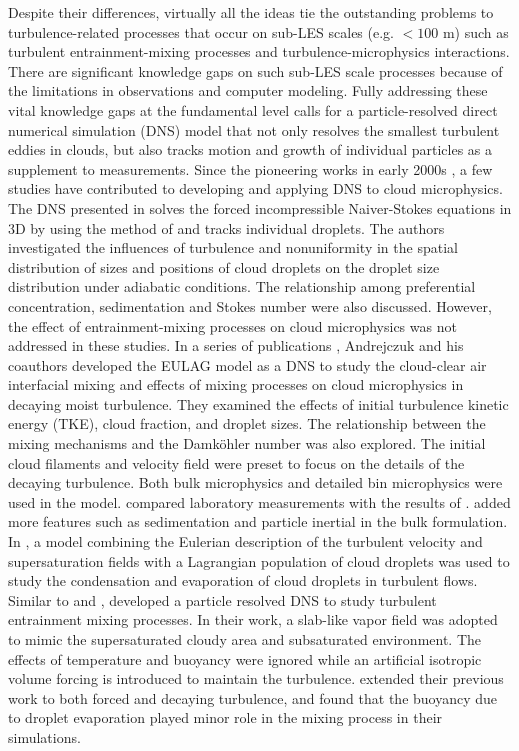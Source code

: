 \documentclass[draft,linenumbers]{AGUJournal}
\begin{document}
Despite their differences, virtually all the ideas tie the outstanding problems to turbulence-related processes that occur on sub-LES scales (e.g. $< 100$ m) such as turbulent entrainment-mixing processes and turbulence-microphysics interactions. There are significant knowledge gaps on such sub-LES scale processes because of the limitations in observations and computer modeling. Fully addressing these vital knowledge gaps at the fundamental level calls for a particle-resolved direct numerical simulation (DNS) model that not only resolves the smallest turbulent eddies in clouds, but also tracks motion and growth of individual particles as a supplement to measurements. Since the pioneering works in early 2000s \citep{Vaillancourt00, Vaillancourt02}, a few studies have contributed to developing and applying DNS to cloud microphysics. The DNS presented in \citet{Vaillancourt00, Vaillancourt02} solves the forced incompressible Naiver-Stokes equations in 3D by using the method of \citet{Sullivan1994} and tracks individual droplets. The authors investigated the influences of turbulence and nonuniformity in the spatial distribution of sizes and positions of cloud droplets on the droplet size distribution under adiabatic conditions. The relationship among preferential concentration, sedimentation and Stokes number were also discussed. However, the effect of entrainment-mixing processes on cloud microphysics was not addressed in these studies. In a series of publications \citep{And04, And06, And09}, Andrejczuk and his coauthors developed the EULAG model as a DNS to study the cloud-clear air interfacial mixing and effects of mixing processes on cloud microphysics in decaying moist turbulence. They examined the effects of initial turbulence kinetic energy (TKE), cloud fraction, and droplet sizes. The relationship between the mixing mechanisms and the Damk\"{o}hler number was also explored. The initial cloud filaments and velocity field were preset to focus on the details of the decaying turbulence. Both bulk microphysics and detailed bin microphysics were used in the model. \citet{Malinowski2008} compared laboratory measurements with the results of \citet{And04, And06}. \citet{LozarMellado2013} added more features such as sedimentation and particle inertial in the bulk formulation. In \citet{Lanotte2009, Celani05}, a model combining the Eulerian description of the turbulent velocity and supersaturation fields with a Lagrangian population of cloud droplets was used to study the condensation and evaporation of cloud droplets in turbulent flows. Similar to \citet{Vaillancourt02} and \citet{Lanotte2009}, \citet{Kumar11, Kumar12} developed a particle resolved DNS to study turbulent entrainment mixing processes. In their work, a slab-like vapor field was adopted to mimic the supersaturated cloudy area and subsaturated environment. The effects of temperature and buoyancy were ignored while an artificial isotropic volume forcing is introduced to maintain the turbulence. \citet{Kumar14} extended their previous work to both forced and decaying turbulence, and found that the buoyancy due to droplet evaporation played minor role in the mixing process in their simulations.
\end{document}
